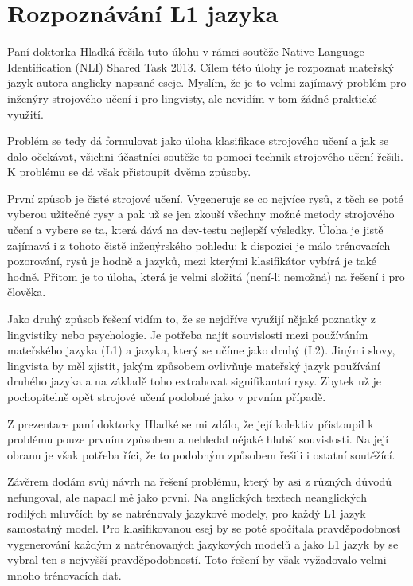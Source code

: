 \documentclass[12pt,a4paper]{report}
\begin{document}
\section*{Rozpoznávání L1 jazyka}

Paní doktorka Hladká řešila tuto úlohu v rámci soutěže Native Language
Identification (NLI) Shared Task 2013.  Cílem této úlohy je rozpoznat mateřský
jazyk autora anglicky napsané eseje.  Myslím, že je to velmi zajímavý problém
pro inženýry strojového učení i pro lingvisty, ale nevidím v tom žádné
praktické využití. 

Problém se tedy dá formulovat jako úloha klasifikace strojového učení a jak se
dalo očekávat, všichni účastníci soutěže to pomocí technik strojového učení
řešili. K problému se dá však přistoupit dvěma způsoby. 

První způsob je čisté strojové učení. Vygeneruje se co nejvíce rysů, z těch se
poté vyberou užitečné rysy a pak už se jen zkouší všechny možné metody
strojového učení a vybere se ta, která dává na dev-testu nejlepší výsledky.
Úloha je jistě zajímavá i z tohoto čistě inženýrského pohledu: k dispozici je
málo trénovacích pozorování, rysů je hodně a jazyků, mezi kterými klasifikátor
vybírá je také hodně. Přitom je to úloha, která je velmi složitá (není-li
nemožná) na řešení i pro člověka. 

Jako druhý způsob řešení vidím to, že se nejdříve využijí nějaké poznatky z
lingvistiky nebo psychologie. Je potřeba najít souvislosti mezi používáním
mateřského jazyka (L1) a jazyka, který se učíme jako druhý (L2). Jinými slovy,
lingvista by měl zjistit, jakým způsobem ovlivňuje mateřský jazyk používání
druhého jazyka a na základě toho extrahovat signifikantní rysy. Zbytek už je
pochopitelně opět strojové učení podobné jako v prvním případě. 

Z prezentace paní doktorky Hladké se mi zdálo, že její kolektiv přistoupil k
problému pouze prvním způsobem a nehledal nějaké hlubší souvislosti. Na její
obranu je však potřeba říci, že to podobným způsobem řešili i ostatní
soutěžící. 

Závěrem dodám svůj návrh na řešení problému, který by asi z různých důvodů
nefungoval, ale napadl mě jako první. Na anglických textech neanglických
rodilých mluvčích by se natrénovaly jazykové modely, pro každý L1 jazyk
samostatný model.  Pro klasifikovanou esej by se poté spočítala pravděpodobnost
vygenerování každým z natrénovaných jazykových modelů a jako L1 jazyk by se
vybral ten s nejvyšší pravděpodobností. Toto řešení by však vyžadovalo velmi
mnoho trénovacích dat. 
\end{document}
